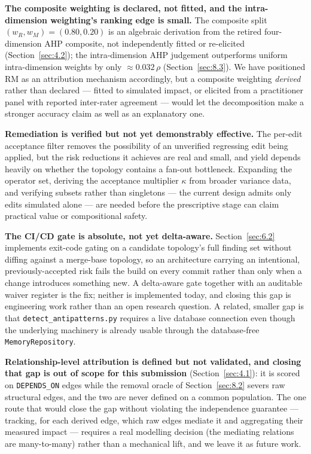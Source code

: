 \textbf{The composite weighting is declared, not fitted, and the intra-dimension weighting's ranking
edge is small.} The composite split \((w_R, w_M) = (0.80, 0.20)\) is an algebraic derivation from the
retired four-dimension AHP composite, not independently fitted or re-elicited (Section~\ref{sec:4.2});
the intra-dimension AHP judgement outperforms uniform intra-dimension weights by only
\(\approx 0.032\,\rho\) (Section~\ref{sec:8.3}). We have positioned RM as an attribution mechanism
accordingly, but a composite weighting \emph{derived} rather than declared --- fitted to simulated
impact, or elicited from a practitioner panel with reported inter-rater agreement --- would let the
decomposition make a stronger accuracy claim as well as an explanatory one.

\textbf{Remediation is verified but not yet demonstrably effective.} The per-edit acceptance filter
removes the possibility of an unverified regressing edit being applied, but the risk reductions it
achieves are real and small, and yield depends heavily on whether the topology contains a fan-out
bottleneck. Expanding the operator set, deriving the acceptance multiplier \(\kappa\) from broader
variance data, and verifying subsets rather than singletons --- the current design admits only edits
simulated alone --- are needed before the prescriptive stage can claim practical value or
compositional safety.

\textbf{The CI/CD gate is absolute, not yet delta-aware.} Section~\ref{sec:6.2} implements exit-code
gating on a candidate topology's full finding set without diffing against a merge-base topology, so
an architecture carrying an intentional, previously-accepted risk fails the build on every commit
rather than only when a change introduces something new. A delta-aware gate together with an
auditable waiver register is the fix; neither is implemented today, and closing this gap is
engineering work rather than an open research question. A related, smaller gap is that
\texttt{detect\_antipatterns.py} requires a live database connection even though the underlying
machinery is already usable through the database-free \texttt{MemoryRepository}.

\textbf{Relationship-level attribution is defined but not validated, and closing that gap is out of
scope for this submission} (Section~\ref{sec:4.1}): it is scored on \texttt{DEPENDS\_ON} edges while
the removal oracle of Section~\ref{sec:8.2} severs raw structural edges, and the two are never defined
on a common population. The one route that would close the gap without violating the independence
guarantee --- tracking, for each derived edge, which raw edges mediate it and aggregating their
measured impact --- requires a real modelling decision (the mediating relations are many-to-many)
rather than a mechanical lift, and we leave it as future work.

